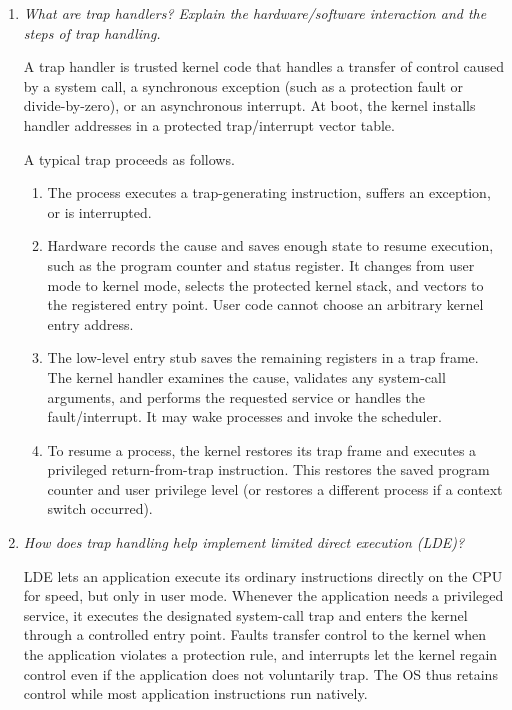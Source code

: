 \begin{enumerate}
\item[(a)] \emph{What are trap handlers?  Explain the hardware/software
interaction and the steps of trap handling.}

A trap handler is trusted kernel code that handles a transfer of control
caused by a system call, a synchronous exception (such as a protection fault
or divide-by-zero), or an asynchronous interrupt.  At boot, the kernel
installs handler addresses in a protected trap/interrupt vector table.

A typical trap proceeds as follows.
\begin{enumerate}
\item The process executes a trap-generating instruction, suffers an
exception, or is interrupted.
\item Hardware records the cause and saves enough state to resume execution,
such as the program counter and status register.  It changes from user mode
to kernel mode, selects the protected kernel stack, and vectors to the
registered entry point.  User code cannot choose an arbitrary kernel entry
address.
\item The low-level entry stub saves the remaining registers in a trap frame.
The kernel handler examines the cause, validates any system-call arguments,
and performs the requested service or handles the fault/interrupt.  It may
wake processes and invoke the scheduler.
\item To resume a process, the kernel restores its trap frame and executes a
privileged return-from-trap instruction.  This restores the saved program
counter and user privilege level (or restores a different process if a
context switch occurred).
\end{enumerate}

\item[(b)] \emph{How does trap handling help implement limited direct
execution (LDE)?}

LDE lets an application execute its ordinary instructions directly on the
CPU for speed, but only in user mode.  Whenever the application needs a
privileged service, it executes the designated system-call trap and enters
the kernel through a controlled entry point.  Faults transfer control to the
kernel when the application violates a protection rule, and interrupts let
the kernel regain control even if the application does not voluntarily trap.
The OS thus retains control while most application instructions run
natively.


\end{enumerate}
